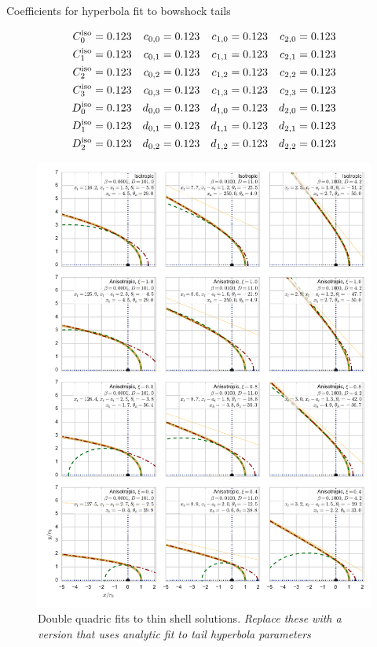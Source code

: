 \begin{table}
  \caption{Coefficients for hyperbola fit to bowshock tails}
  \label{tab:tail-fit-coeffs}
  \begin{align*}
  C^{\mathrm{iso}}_0 & = {0.123}  & c_{0,0} & = {0.123} & c_{1,0} & = {0.123} & c_{2,0} & = {0.123} \\
  C^{\mathrm{iso}}_1 & = {0.123}  & c_{0,1} & = {0.123} & c_{1,1} & = {0.123} & c_{2,1} & = {0.123} \\
  C^{\mathrm{iso}}_2 & = {0.123}  & c_{0,2} & = {0.123} & c_{1,2} & = {0.123} & c_{2,2} & = {0.123} \\
  C^{\mathrm{iso}}_3 & = {0.123}  & c_{0,3} & = {0.123} & c_{1,3} & = {0.123} & c_{2,3} & = {0.123} \\
  D^{\mathrm{iso}}_0 & = {0.123}  & d_{0,0} & = {0.123} & d_{1,0} & = {0.123} & d_{2,0} & = {0.123} \\
  D^{\mathrm{iso}}_1 & = {0.123}  & d_{0,1} & = {0.123} & d_{1,1} & = {0.123} & d_{2,1} & = {0.123} \\
  D^{\mathrm{iso}}_2 & = {0.123}  & d_{0,2} & = {0.123} & d_{1,2} & = {0.123} & d_{2,2} & = {0.123} \\
  \end{align*}
\end{table}




\begin{figure}
  \centering
  \includegraphics[width=\linewidth]{figs/conic-head-tail-fit}
  \caption{Double quadric fits to thin shell
    solutions. \textit{Replace these with a version that uses analytic
    fit to tail hyperbola parameters}}
  \label{fig:head-tail}
\end{figure}

